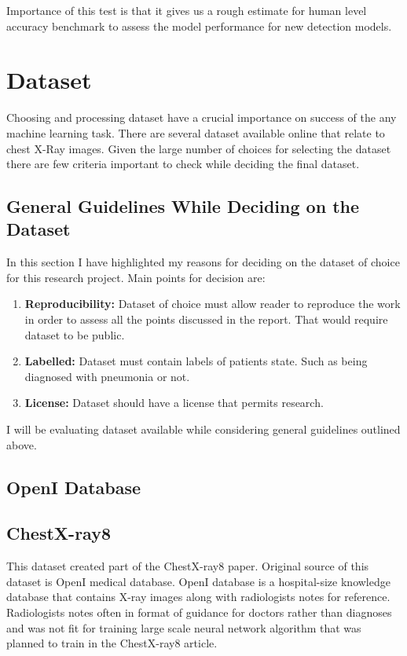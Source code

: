 \documentclass[12pt, twoside, a4paper]{article}
\begin{document}
Importance of this test is that it gives us a rough estimate for human level accuracy benchmark to assess the model performance for new detection models.


\clearpage
\section{Dataset}
Choosing and processing dataset have a crucial importance on success of the any machine learning task. There are several dataset available online that relate to chest X-Ray images. Given the large number of choices for selecting the dataset there are few criteria important to check while deciding the final dataset.

\subsection{General Guidelines While Deciding on the Dataset}
In this section I have highlighted my reasons for deciding on the dataset of choice for this research project. Main points for decision are:
\begin{enumerate}
    \item \textbf{Reproducibility: }Dataset of choice must allow reader to reproduce the work in order to assess all the points discussed in the report. That would require dataset to be public.
    \item \textbf{Labelled: }Dataset must contain labels of patients state. Such as being diagnosed with pneumonia or not.
    \item \textbf{License: }Dataset should have a license that permits research.
\end{enumerate}
I will be evaluating dataset available while considering general guidelines outlined above.

\subsection{OpenI Database}

\subsection{ChestX-ray8}
This dataset created part of the ChestX-ray8\cite{ChestX-ray8} paper. Original source of this dataset is OpenI\cite{openi} medical database. OpenI database is a hospital-size knowledge database that contains X-ray images along with radiologists notes for reference. Radiologists notes often in format of guidance for doctors rather than diagnoses and was not fit for training large scale neural network algorithm that was planned to train in the ChestX-ray8 article.
\end{document}

